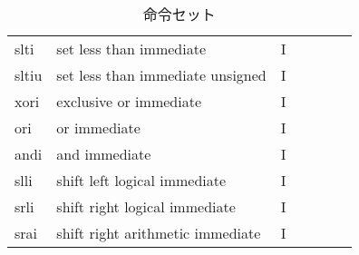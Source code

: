 \documentclass[../specifications.tex]{subfiles}
\begin{document}
\begin{table*}[t]
\begin{tabular}{|l|l|l|llll}
    slti  & set less than immediate               & I  &                       &                             &                                                    &                         \\
    sltiu & set less than immediate unsigned      & I  &                       &                             &                                                    &                         \\
    xori  & exclusive or immediate                & I  &                       &                             &                                                    &                         \\
    ori   & or immediate                          & I  &                       &                             &                                                    &                         \\
    andi  & and immediate                         & I  &                       &                             &                                                    &                         \\
    slli  & shift left logical immediate          & I  &                       &                             &                                                    &                         \\
    srli  & shift right logical immediate         & I  &                       &                             &                                                    &                         \\
    srai  & shift right arithmetic immediate      & I  &                       &                             &                                                    &                         \\ \cline{1-3}
    \end{tabular}
    \caption{命令セット}
    \label{table:isa}
  \end{table*}
  
\end{document}
